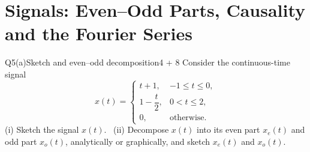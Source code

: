 \renewcommand{\teacherTag}{QUESTION 5 \textbullet\ MANDATORY \textbullet\ 35 MARKS}
\chapter{Signals: Even--Odd Parts, Causality and the Fourier Series}

\begin{qcard}{Q5(a)}{Sketch and even--odd decomposition}{4 + 8}
Consider the continuous-time signal
\[x(t)=\begin{cases}t+1,&-1\le t\le0,\\[2pt]1-\dfrac t2,&0<t\le2,\\[4pt]0,&\text{otherwise}.\end{cases}\]
(i) Sketch the signal $x(t)$. \ (ii) Decompose $x(t)$ into its even part $x_e(t)$ and odd part $x_o(t)$, analytically or graphically, and sketch $x_e(t)$ and $x_o(t)$.
\end{qcard}

